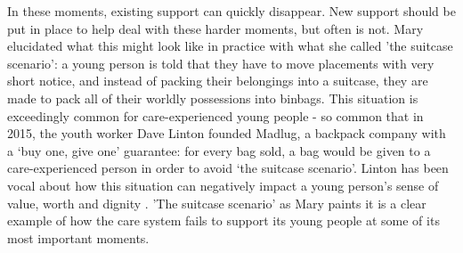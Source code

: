 In these moments, existing support can quickly disappear. New support should be put in place to help deal with these harder moments, but often is not. Mary elucidated what this might look like in practice with what she called 'the suitcase scenario': a young person is told that they have to move placements with very short notice, and instead of packing their belongings into a suitcase, they are made to pack all of their worldly possessions into  binbags. This situation is exceedingly common for care-experienced young people - so common that in 2015, the youth worker Dave Linton founded Madlug, a backpack company with a ‘buy one, give one’ guarantee: for every bag sold, a bag would be given to a care-experienced person in order to avoid ‘the suitcase scenario’. Linton has been vocal about how this situation can negatively impact a young person's sense of value, worth and dignity \citep{madlug website our-story}. 'The suitcase scenario' as Mary paints it is a clear example of how the care system fails to support its young people at some of its most important moments.

